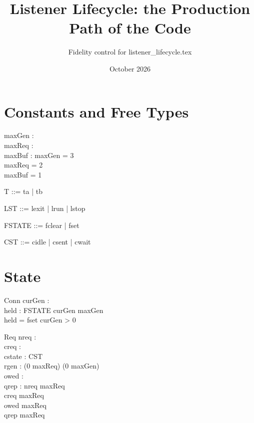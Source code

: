 \documentclass[a4paper,10pt,fleqn]{article}
\begin{document}
\title{Listener Lifecycle: the Production Path of the Code}
\author{Fidelity control for listener\_lifecycle.tex}
\date{October 2026}
\maketitle

\section{Constants and Free Types}

\begin{axdef}
  maxGen : \nat \\
  maxReq : \nat \\
  maxBuf : \nat
\where
  maxGen = 3 \\
  maxReq = 2 \\
  maxBuf = 1
\end{axdef}

\begin{zed}
  T ::= ta | tb
\end{zed}

\begin{zed}
  LST ::= lexit | lrun | lstop
\end{zed}

\begin{zed}
  FSTATE ::= fclear | fset
\end{zed}

\begin{zed}
  CST ::= cidle | csent | cwait
\end{zed}

\section{State}

\begin{schema}{Conn}
  curGen : \nat \\
  held : FSTATE
\where
  curGen \leq maxGen \\
  held = fset \implies curGen > 0
\end{schema}

\begin{schema}{Req}
  nreq : \nat \\
  creq : \nat \\
  cstate : CST \\
  rgen : (0 \upto maxReq) \fun (0 \upto maxGen) \\
  owed : \power \nat \\
  qrep : \power \nat
\where
  nreq \leq maxReq \\
  creq \leq maxReq \\
  owed  \upto maxReq \\
  qrep  \upto maxReq
\end{schema}
\end{document}
